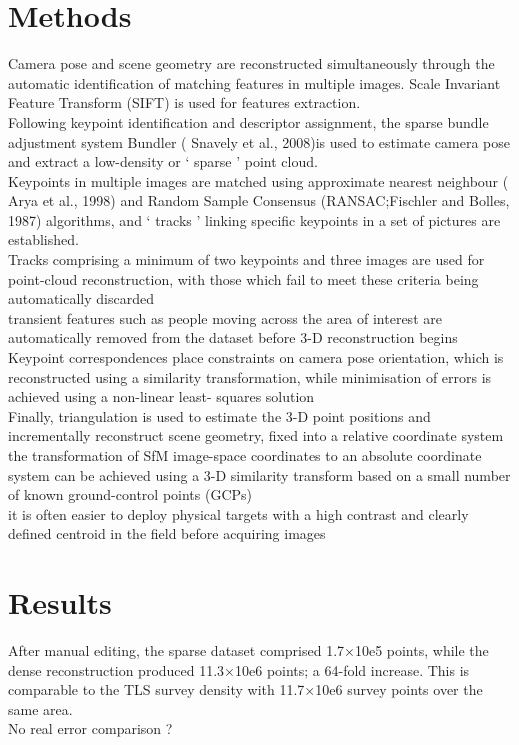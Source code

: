 \documentclass[twoside,twocolumn]{article}
\begin{document}
\section{Methods}
Camera pose and scene geometry are reconstructed simultaneously through the automatic
identification of matching features in multiple images. Scale Invariant Feature Transform (SIFT) is used for features extraction.
\\
Following keypoint identification and descriptor assignment, the sparse bundle adjustment system Bundler (
Snavely et al., 2008)is used to estimate camera pose and extract a low-density or
‘
sparse
’
point cloud.
\\
Keypoints in multiple images are matched using approximate nearest neighbour (
Arya et al., 1998) and Random Sample Consensus (RANSAC;Fischler and Bolles, 1987) algorithms, and
‘
tracks
’
linking specific keypoints in a set of pictures are established.
\\
Tracks
comprising a minimum of two keypoints and three images are used
for point-cloud reconstruction, with those which fail to meet these
criteria being automatically discarded
\\
transient features such as people moving across the
area of interest are automatically removed from the dataset before
3-D reconstruction begins
\\
Keypoint correspondences place constraints on camera pose orientation, which is reconstructed using a similarity transformation,
while minimisation of errors is achieved using a non-linear least-
squares solution
\\
Finally, triangulation is used to estimate the 3-D point positions and incrementally reconstruct scene geometry,
fixed into a relative coordinate system
\\
the transformation of SfM image-space coordinates to an absolute coordinate system
can be achieved using a 3-D similarity transform based on a small number of known
ground-control points (GCPs)
\\
it is often easier to deploy physical targets with a high
contrast and clearly defined centroid in the field before acquiring images

\section{Results}
After manual editing, the sparse dataset comprised 1.7×10e5
points, while the dense reconstruction produced 11.3×10e6 points; a 64-fold increase. This is comparable to the
TLS survey density with 11.7×10e6 survey points over the same area.
\\
No real error comparison ?
\end{document}
